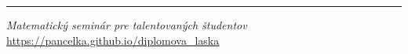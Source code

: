 \printbibliography

\vfill
\noindent\rule{\textwidth}{1pt}
\textit{Matematický seminár pre talentovaných študentov}\\
\url{https://pancelka.github.io/diplomova_laska}

